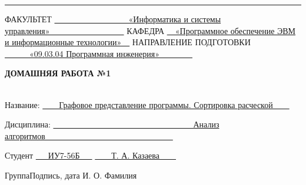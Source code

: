 \begin{titlepage}
	\noindent\rule{18cm}{1.5pt}
	
	\vspace{8mm}
	
	\noindent\textnormal{ФАКУЛЬТЕТ}\hspace{5mm} \underline{\textnormal{~~~~~~~~~~~~~~~~~~«Информатика и системы управления»~~~~~~~~~~~~~~~~~~}} \newline\newline
	\textnormal{КАФЕДРА}\hspace{5mm} \underline{\textnormal{~~«Программное обеспечение ЭВМ и информационные технологии»~~}}
	\newline\newline
	\textnormal{НАПРАВЛЕНИЕ ПОДГОТОВКИ}\hspace{5mm} \underline{\textnormal{~~~~~~«09.03.04 Программная инженерия»~~~~~~~~}}
	
	\vspace{2.5cm}
	
	\begin{center}
		\Large\textbf{\textsc{ДОМАШНЯЯ РАБОТА №1}}\\
		\Large\textbf{}\\
	\end{center}
	
	\vspace{1cm}
	
	\noindent\textnormal{Название:} \hspace{15mm} \underline{\textnormal{~~~~Графовое представление программы. Сортировка расческой~~~~}}\noindent
	
	\vspace{1.3cm}
	
	\noindent\textnormal{Дисциплина:} \hspace{10mm} \underline{\textnormal{~~~~~~~~~~~~~~~~~~~~~~~~~~~~~~~~~~Анализ алгоритмов~~~~~~~~~~~~~~~~~~~~~~~~~~~~~~~}}\noindent
	
	\vspace{2cm}
	
	\noindent\textnormal{Студент} \hspace{17mm}
	\underline{\textnormal{{~~~ИУ7-56Б~~~}}}
	\hspace{20mm}
	\underline{\textnormal{\hphantom{~~~~~~~~~~~~~~~~~~~~~~~~~~~}}} \hspace{15mm}
	\underline{\textnormal{~~~~Т. А. Казаева~~~~}}
	
	\vspace{2mm}
	\noindent\textnormal{\hphantom{Студент}} \hspace{23mm}\noindent
	\fontsize{8pt}{8pt}
	\textnormal{Группа}\hspace{40mm}\textnormal{Подпись, дата} \hspace{30mm}\noindent\textnormal{И. О. Фамилия}
	

\end{titlepage}
